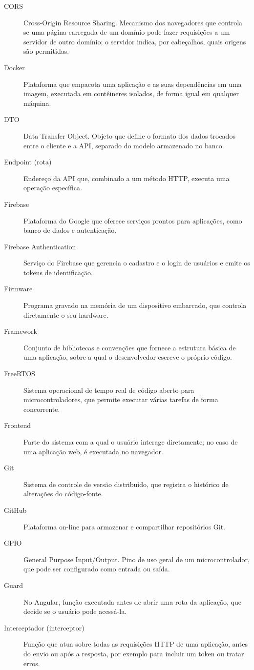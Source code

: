 \begin{description}
  \item[CORS] Cross-Origin Resource Sharing. Mecanismo dos navegadores que controla se uma página carregada de um domínio pode fazer requisições a um servidor de outro domínio; o servidor indica, por cabeçalhos, quais origens são permitidas.
  \item[Docker] Plataforma que empacota uma aplicação e as suas dependências em uma imagem, executada em contêineres isolados, de forma igual em qualquer máquina.
  \item[DTO] Data Transfer Object. Objeto que define o formato dos dados trocados entre o cliente e a API, separado do modelo armazenado no banco.
  \item[Endpoint (rota)] Endereço da API que, combinado a um método HTTP, executa uma operação específica.
  \item[Firebase] Plataforma do Google que oferece serviços prontos para aplicações, como banco de dados e autenticação.
  \item[Firebase Authentication] Serviço do Firebase que gerencia o cadastro e o login de usuários e emite os tokens de identificação.
  \item[Firmware] Programa gravado na memória de um dispositivo embarcado, que controla diretamente o seu hardware.
  \item[Framework] Conjunto de bibliotecas e convenções que fornece a estrutura básica de uma aplicação, sobre a qual o desenvolvedor escreve o próprio código.
  \item[FreeRTOS] Sistema operacional de tempo real de código aberto para microcontroladores, que permite executar várias tarefas de forma concorrente.
  \item[Frontend] Parte do sistema com a qual o usuário interage diretamente; no caso de uma aplicação web, é executada no navegador.
  \item[Git] Sistema de controle de versão distribuído, que registra o histórico de alterações do código-fonte.
  \item[GitHub] Plataforma on-line para armazenar e compartilhar repositórios Git.
  \item[GPIO] General Purpose Input/Output. Pino de uso geral de um microcontrolador, que pode ser configurado como entrada ou saída.
  \item[Guard] No Angular, função executada antes de abrir uma rota da aplicação, que decide se o usuário pode acessá-la.
  \item[Interceptador (interceptor)] Função que atua sobre todas as requisições HTTP de uma aplicação, antes do envio ou após a resposta, por exemplo para incluir um token ou tratar erros.

\end{description}
